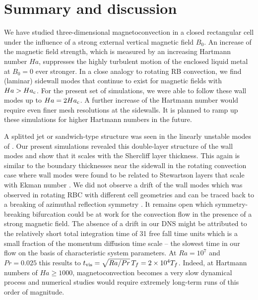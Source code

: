 \documentclass{jfm}
\begin{document}
\section{Summary and discussion}
We have studied three-dimensional magnetoconvection in a closed rectangular cell under the influence of a strong external vertical magnetic field $B_0$. 
An increase of the magnetic field strength, which is measured by an increasing Hartmann number $Ha$, suppresses the highly turbulent motion of the enclosed 
liquid metal at $B_0=0$ ever stronger. In a close analogy to rotating RB convection, we find (laminar) sidewall modes that continue to exist for magnetic fields 
with $Ha>Ha_{\rm c}$. For the present set of simulations, we were able to follow these wall modes up to $Ha=2 Ha_{\rm c}$. A further increase of the Hartmann number
would require even finer mesh resolutions at the sidewalls. 
It is planned to ramp up these simulations for higher Hartmann numbers in the future.

A splitted jet or sandwich-type structure was seen in the linearly unstable modes of \cite{Houchens2002}. Our present simulations 
revealed this double-layer structure of the wall modes and show that it scales with the Shercliff layer thickness.  This again is similar to the boundary 
thicknesses near the sidewall in the rotating convection case where wall modes were found to be related to Stewartson layers that scale with Ekman number 
\citep{Kunnen2011,Kunnen2013}. We did not observe a drift of the wall modes which was observed in rotating RBC with different cell geometries
\citep{Knobloch1998,Vasil2008,Horn2017} and can be traced back to a breaking of azimuthal reflection symmetry \citep{Ecke1992}. It remains 
open which symmetry-breaking bifurcation could be at work for the convection flow in the presence of a strong magnetic field. The absence of a drift in our DNS might 
be attributed to the relatively short total integration time of 31 free fall time units which is a small fraction of the momentum diffusion time scale -- the slowest time in our flow on the basis of characteristic system parameters. At $Ra=10^7$ and $Pr=0.025$ this results to $t_{\rm vis}=\sqrt{Ra/Pr}\,T_f = 2\times 10^4 T_f$.  
Indeed, at Hartmann numbers of  $Ha\geq 1000$, magnetoconvection becomes a very slow dynamical process and numerical studies would require extremely long-term runs of this order of magnitude. 
\end{document}
